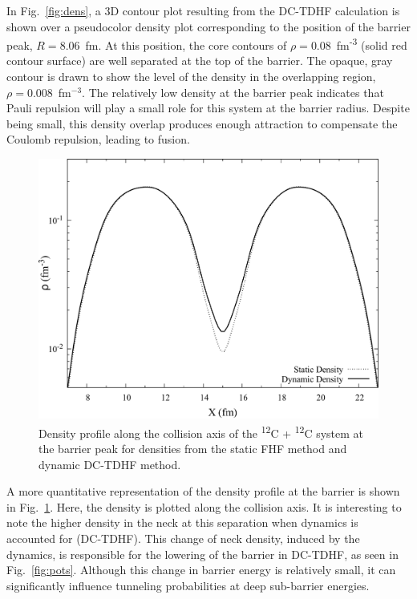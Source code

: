 In Fig.~\ref{fig:dens}, a 3D contour plot resulting from the DC-TDHF calculation is shown over a pseudocolor density plot corresponding to the position of the barrier peak, $R=8.06$~fm. 
At this position, the core contours of $\rho = 0.08$~fm\textsuperscript{-3} (solid red contour surface) are well separated at the top of the barrier. 
The opaque, gray contour is drawn to show the level of the density in the overlapping region, $\rho = 0.008$~fm$^{-3}$.
The relatively low density at the barrier peak indicates that Pauli repulsion will play a small role for this system at the barrier radius.
Despite being small, this density overlap produces enough attraction to compensate the Coulomb repulsion, leading to fusion.

\begin{figure}
	\includegraphics*[width=\textwidth]{../Figures/CC/DensityProfile.pdf}
	\caption{Density profile along the collision axis of the \textsuperscript{12}C + \textsuperscript{12}C system at the barrier peak for densities from the static FHF method and dynamic DC-TDHF method. }
	\label{fig:denstrace}
\end{figure}

A more quantitative representation of the density profile at the barrier is shown in Fig.~\ref{fig:denstrace}.
Here, the density is plotted along the collision axis. 
It is interesting to note the higher density in the neck at this separation when dynamics is accounted for (DC-TDHF).
This change of neck density, induced by the dynamics, is responsible for the lowering of the barrier in DC-TDHF, as seen in Fig.~\ref{fig:pots}.
Although this change in barrier energy is relatively small, it can significantly influence tunneling probabilities at deep sub-barrier energies. 

